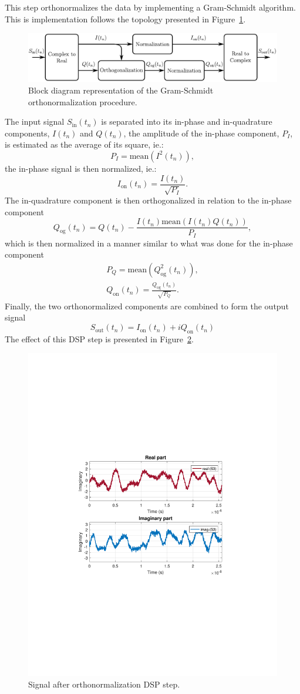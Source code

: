 This step orthonormalizes the data by implementing a Gram-Schmidt algorithm. This is implementation follows the topology presented in Figure~\ref{fig:mqamDiagramDSP_GS}.
%
\begin{figure}[h]
\centering
\includegraphics[width=\linewidth]{./sdf/m_qam_system/figures/DSP_section/diagramDSP_GS}
\caption{Block diagram representation of the Gram-Schmidt orthonormalization procedure.}
\label{fig:mqamDiagramDSP_GS}
\end{figure}
%
The input signal $S_\text{in}(t_n)$ is separated into its in-phase and in-quadrature components, $I(t_n)$ and $Q(t_n)$, the amplitude of the in-phase component, $P_I$, is estimated as the average of its square, ie.:
\begin{equation}
P_I=\text{mean}(I^2(t_n)),
\end{equation}
the in-phase signal is then normalized, ie.:
\begin{equation}
I_\text{on}(t_n)=\frac{I(t_n)}{\sqrt{P_I}}.
\end{equation}
The in-quadrature component is then orthogonalized in relation to the in-phase component
\begin{equation}
Q_\text{og}(t_n)=Q(t_n)-\frac{I(t_n)\text{mean}(I(t_n)Q(t_n))}{P_I},
\end{equation}
which is then normalized in a manner similar to what was done for the in-phase component
\begin{align}
P_Q=\text{mean}(Q_\text{og}^2(t_n)),\\
Q_\text{on}(t_n)=\frac{Q_\text{og}(t_n)}{\sqrt{P_Q}}.
\end{align}
Finally, the two orthonormalized components are combined to form the output signal
\begin{equation}
S_\text{out}(t_n)=I_\text{on}(t_n)+iQ_\text{on}(t_n)
\end{equation}
The effect of this DSP step is presented in Figure~\ref{fig:S3II}.
\begin{figure}[h]
\centering
\includegraphics[trim={7cm 8cm 7cm 8cm},width=.3\linewidth]{./sdf/m_qam_system/figures/DSP_section/S3II}
\caption{Signal after orthonormalization DSP step.}
\label{fig:S3II}
\end{figure}	
%
